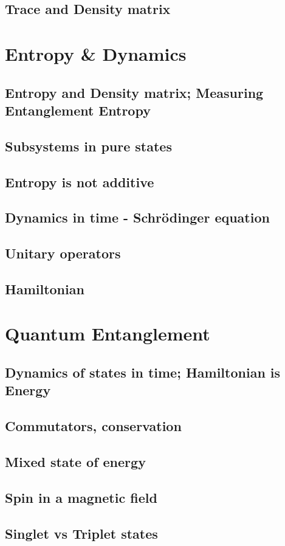 \documentclass[]{article}
\begin{document}
 \subsection{Trace and Density matrix }
 
\section{Entropy \& Dynamics}

\subsection{Entropy and Density matrix; Measuring Entanglement Entropy} 

\subsection{Subsystems in pure states}

\subsection{Entropy is not additive}

\subsection{Dynamics in time - Schr\"odinger equation}

\subsection{Unitary operators}

\subsection{Hamiltonian}

\section{Quantum Entanglement}

\subsection{Dynamics of states in time; Hamiltonian is Energy}

\subsection{Commutators, conservation}

\subsection{Mixed state of energy}

\subsection{Spin in a magnetic field}

\subsection{Singlet vs Triplet states}


\raggedright

\end{document}
